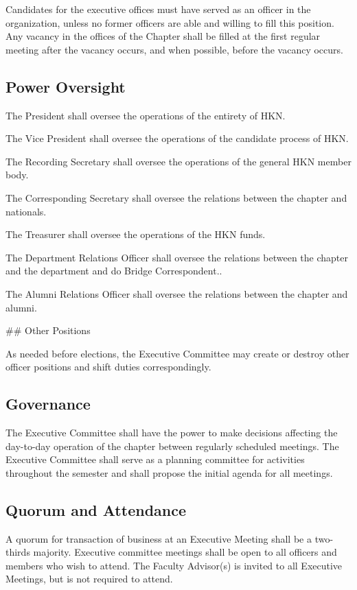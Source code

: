 \documentclass[11pt]{article}
\begin{document}
Candidates for the executive offices must have served as an officer in the organization, unless no former officers are able and willing to fill this position.
Any vacancy in the offices of the Chapter shall be filled at the first regular meeting after the vacancy occurs, and when possible, before the vacancy occurs.

\subsection{Power Oversight}
\label{sec:org0ed980e}

The President shall oversee the operations of the entirety of HKN.

The Vice President shall oversee the operations of the candidate process of HKN.

The Recording Secretary shall oversee the operations of the general HKN member body.

The Corresponding Secretary shall oversee the relations between the chapter and nationals.

The Treasurer shall oversee the operations of the HKN funds.

The Department Relations Officer shall oversee the relations between the chapter and the department and do Bridge Correspondent..

The Alumni Relations Officer shall oversee the relations between the chapter and alumni.

\#\# Other Positions

As needed before elections, the Executive Committee may create or destroy other officer positions and shift duties correspondingly.

\subsection{Governance}
\label{sec:org7d2d77c}

The Executive Committee shall have the power to make decisions affecting the day-to-day operation of the chapter between regularly scheduled meetings.
The Executive Committee shall serve as a planning committee for activities throughout the semester and shall propose the initial agenda for all meetings.

\subsection{Quorum and Attendance}
\label{sec:orgf848946}

A quorum for transaction of business at an Executive Meeting shall be a two-thirds majority.
Executive committee meetings shall be open to all officers and members who wish to attend.
The Faculty Advisor(s) is invited to all Executive Meetings, but is not required to attend.
\end{document}
